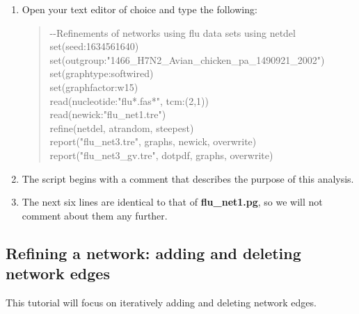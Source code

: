 \documentclass[11pt]{article}
\begin{document}
\begin {enumerate}

\item Open your text editor of choice and type the following:

	\begin{quote}	
	-\/-Refinements of networks using flu data sets using netdel\\
	set(seed:1634561640)\\
	set(outgroup:"1466\_H7N2\_Avian\_chicken\_pa\_1490921\_2002")\\
	set(graphtype:softwired)\\
	set(graphfactor:w15)\\ 
	read(nucleotide:"flu*.fas*", tcm:(2,1))\\
	read(newick:"flu\_net1.tre")\\
	refine(netdel, atrandom, steepest)\\
	report("flu\_net3.tre", graphs, newick, overwrite)\\
	report("flu\_net3\_gv.tre", dotpdf, graphs, overwrite)
	\end{quote}

\item The script begins with a comment that describes the purpose of this 
analysis.

\item The next six lines are identical to that of \textbf{flu\_net1.pg}, so we 
will not comment about them any further. 

\end{enumerate}
\subsection{Refining a network: adding and deleting network edges}
\label{subsec:netdel}

This tutorial will focus on iteratively adding and deleting network edges.
\end{document}
